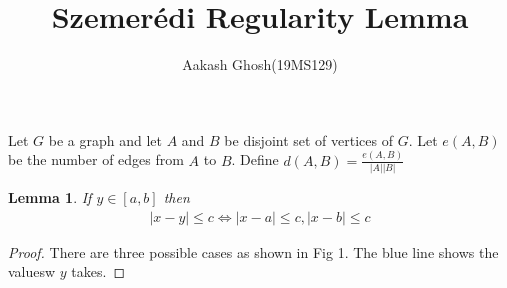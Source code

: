 \documentclass{tufte-handout}
\title{Szemerédi Regularity Lemma}
\author[Aaksh Ghosh]{Aakash Ghosh(19MS129)}
\newtheorem{lemma}[theorem]{Lemma}
\begin{document}
\maketitle%

\begin{abstract}
\noindent
\end{abstract}
Let $G$ be a graph and let $A$ and $B$ be disjoint set of vertices of $G$. Let $e(A,B)$ be the number of edges from $A$ to $B$. Define $d(A,B)=\frac{e(A,B)}{|A||B|}$  


\begin{lemma}
	If $y\in[a,b]$ then
	\begin{align}
	|x-y|\leq c\Leftrightarrow |x-a|\leq c,|x-b|\leq c
	\end{align}
\end{lemma}
\begin{proof}
There are three possible cases as shown in Fig 1. The blue line shows the valuesw $y$ takes.

\end{proof}
\end{document}
